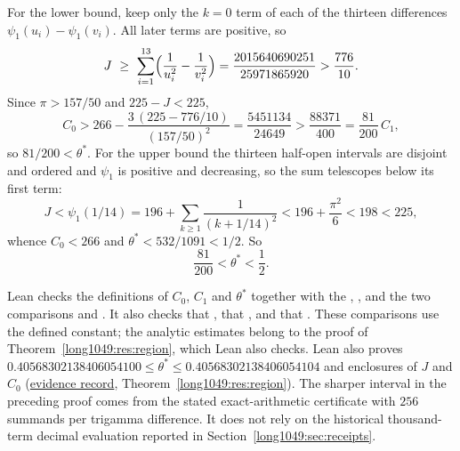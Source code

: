For the lower bound, keep only the $k=0$ term of each of the thirteen
differences $\psi_1(u_i)-\psi_1(v_i)$.  All later terms are positive, so
\[
 J\ \ge\ \sum_{i=1}^{13}\Bigl(\frac1{u_i^{2}}-\frac1{v_i^{2}}\Bigr)
  =\frac{2015640690251}{25971865920}
  >\frac{776}{10}.
\]
Since $\pi>157/50$ and $225-J<225$,
\[
 C_0>266-\frac{3\,(225-776/10)}{(157/50)^{2}}=\frac{5451134}{24649}
 >\frac{88371}{400}=\frac{81}{200}\,C_1,
\]
so $81/200<\theta^{*}$.  For the upper bound the thirteen half-open intervals are
disjoint and ordered and $\psi_1$ is positive and decreasing, so the sum
telescopes below its first term:
\[
 J<\psi_1(1/14)=196+\sum_{k\ge1}\frac1{(k+1/14)^{2}}<196+\frac{\pi^{2}}6<198<225,
\]
whence $C_0<266$ and $\theta^{*}<532/1091<1/2$.  So
\[
 \frac{81}{200}<\theta^{*}<\frac12 .
\]

Lean checks the definitions of $C_0$, $C_1$ and $\theta^*$ together
with the
,
,
and the two comparisons
and
.
It also checks that
,
that ,
and that .
These comparisons use the defined constant; the analytic estimates belong
to the proof of Theorem~\ref{long1049:res:region}, which Lean also checks.
Lean also proves
$0.40568302138406054100\le\theta^*\le0.40568302138406054104$ and
enclosures of $J$ and $C_0$ (\href{\evidencerecordurl}{evidence record},
Theorem~\ref{long1049:res:region}). The sharper
interval in the preceding proof comes from the stated
exact-arithmetic certificate with $256$ summands per trigamma
difference. It does not rely on the historical thousand-term decimal
evaluation reported in Section~\ref{long1049:sec:receipts}.

